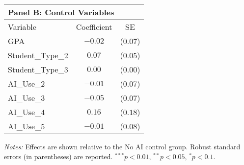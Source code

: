 \begin{table}[!htbp]
\begin{tabular}{lcc}
\multicolumn{3}{l}{\textbf{Panel B: Control Variables}} \\
\hline\hline
Variable & Coefficient & SE \\
\hline
GPA & $-0.02$ & ($0.07$) \\
Student_Type_2 & $0.07$ & ($0.05$) \\
Student_Type_3 & $0.00$ & ($0.00$) \\
AI_Use_2 & $-0.01$ & ($0.07$) \\
AI_Use_3 & $-0.05$ & ($0.07$) \\
AI_Use_4 & $0.16$ & ($0.18$) \\
AI_Use_5 & $-0.01$ & ($0.08$) \\
\hline
\end{tabular}
\begin{tablenotes}
\small
\item \textit{Notes:} Effects are shown relative to the No AI control group. Robust standard errors (in parentheses) are reported. $^{***}p<0.01$, $^{**}p<0.05$, $^{*}p<0.1$.
\end{tablenotes}
\end{table}